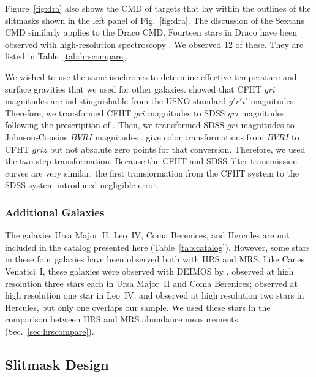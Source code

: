 \documentclass{emulateapj}
\begin{document}
Figure~\ref{fig:dra} also shows the CMD of targets that lay within the
outlines of the slitmasks shown in the left panel of
Fig.~\ref{fig:dra}.  The discussion of the Sextans CMD similarly
applies to the Draco CMD\@.  Fourteen stars in Draco have been
observed with high-resolution spectroscopy
\citep{she98,she01a,ful04,coh09}.  We observed 12 of these.  They are
listed in Table~\ref{tab:hrscompare}.

We wished to use the same isochrones to determine effective
temperature and surface gravities that we used for other galaxies.
\citet{cle08} showed that CFHT $gri$ magnitudes are indistinguishable
from the USNO standard $g'r'i'$ magnitudes.  Therefore, we transformed
CFHT $gri$ magnitudes to SDSS $gri$ magnitudes following the
prescription of \citet[]{tuc06}.  Then, we transformed SDSS $gri$
magnitudes to Johnson-Cousins $BVRI$ magnitudes \citep{jor06}.
\citet{reg09} give color transformations from $BVRI$ to CFHT $griz$
but not absolute zero points for that conversion.  Therefore, we used
the two-step transformation.  Because the CFHT and SDSS filter
transmission curves are very similar, the first transformation from
the CFHT system to the SDSS system introduced negligible error.

\subsubsection{Additional Galaxies}

The galaxies Ursa Major~II, Leo~IV, Coma Berenices, and Hercules are
not included in the catalog presented here (Table~\ref{tab:catalog}).
However, some stars in these four galaxies have been observed both
with HRS and MRS.  Like Canes Venatici~I, these galaxies were observed
with DEIMOS by \citet{sim07}.  \citet{fre10b} observed at
high resolution three stars each in Ursa Major~II and Coma Berenices;
\citet{sim10} observed at high resolution one star in Leo~IV; and
\citet{koc08} observed at high resolution two stars in Hercules, but
only one overlaps our sample.  We used these stars in the comparison
between HRS and MRS abundance measurements
(Sec.~\ref{sec:hrscompare}).


\subsection{Slitmask Design}
\end{document}
